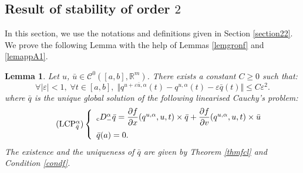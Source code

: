 \documentclass[english,11pt,reqno]{smfart}
\newtheorem{lemma}[theorem]{Lemma}
\def\eps{\varepsilon}
\newcommand{\R}{\mathbb{R}}
\newcommand{\CC}{\mathscr{C}}
\newcommand{\cDM}{{}_{{\rm c}} D^\alpha_-}
\begin{document}
\subsection{Result of stability of order $2$}\label{appAc}
In this section, we use the notations and definitions given in Section \ref{section22}. We prove the following Lemma with the help of Lemmas \ref{lemgronf} and \ref{lemappA1}.
\begin{lemma}\label{lemappA2}
Let $u$, $\bar{u} \in \CC^0 ([a,b],\R^m)$. There exists a constant $C \geq 0$ such that:
\begin{equation}
\forall \vert \eps \vert < 1, \; \forall t \in [a,b], \; \Vert q^{u+ \eps \bar{u},\alpha} (t) - q^{u,\alpha}(t) - \eps \bar{q}(t) \Vert \leq C \eps^2 .
\end{equation}
where $\bar{q}$ is the unique global solution of the following linearised Cauchy's problem:
\begin{equation}\tag{LCP${}^\alpha_{\bar{q}}$}
 \left\lbrace \begin{array}{l}
 		\cDM \bar{q} = \dfrac{\partial f}{\partial x} (q^{u,\alpha},u,t) \times \bar{q} + \dfrac{\partial f}{\partial v} (q^{u,\alpha},u,t) \times \bar{u} \\[10pt]
 		\bar{q}(a) = 0.
        \end{array}
\right. 
\end{equation}
The existence and the uniqueness of $\bar{q}$ are given by Theorem \ref{thmfcl} and Condition \eqref{condf}.
\end{lemma}
\end{document}
